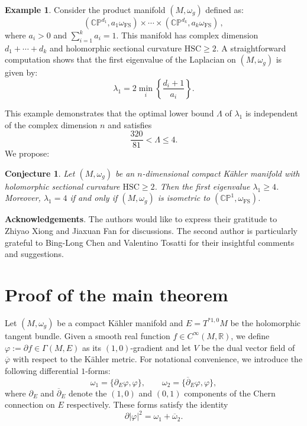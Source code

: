 \documentclass[12pt, reqno]{amsart}
\newcommand\bp{{\bar\partial}}
\theoremstyle{plain}
\newtheorem{conjecture}[thm]{Conjecture}
\theoremstyle{definition}
\newtheorem{example}[thm]{Example}
\newcommand{\eexample}{\end{example}}
\newcommand{\bexample}{\begin{example}}
\newcommand{\p}{\partial}
\renewcommand{\bar}{\overline}
\renewcommand{\phi}{\varphi}
\newcommand{\beq}{\begin{equation}}
\newcommand{\eeq}{\end{equation}}
\renewcommand{\bp}{\bar{\partial}}
\renewcommand{\>}{\rightarrow}
\newcommand{\C}{{\mathbb C}}
\renewcommand{\P}{{\mathbb P}}
\renewcommand{\#}{\sharp}
\numberwithin{equation}{section} %
\begin{document}
\bexample
Consider the product manifold $(M,\omega_g)$ defined as:
$$
(\mathbb{C}\mathbb{P}^{d_1},a_1\omega_{\mathrm{FS}})\times\cdots\times(\mathbb{C}\mathbb{P}^{d_k},a_k\omega_{\mathrm{FS}})\,,
$$
where $a_i> 0$ and $\sum\limits_{i=1}^k a_i=1$. This manifold has complex dimension $d_1+\cdots +d_k$ and
 holomorphic sectional curvature $\mathrm{HSC}\geq 2$. A straightforward computation shows that the first eigenvalue of the Laplacian on $(M,\omega_g)$ is given by:
\beq 
\lambda_1=2\min_i  \left\{\frac{d_i+1}{a_i}\right\}.\label{producteigenvalue}
\eeq 
\eexample
\noindent This example demonstrates that the optimal lower bound $\Lambda$ of $\lambda_1$ is
independent of the complex dimension $n$ and satisfies  \beq \frac{320}{81}< \Lambda\leq 4.\eeq  We propose:
\begin{conjecture} Let $ (M,\omega_g) $ be an $n$-dimensional compact K\"ahler manifold with holomorphic sectional
curvature $\mathrm{HSC}  \geq 2 $.  Then the first
eigenvalue $\lambda_1\geq 4$.
Moreover, $\lambda_1=4$ if and only if $(M,\omega_g)$ is isometric to $(\C\P^1, \omega_{\mathrm{FS}})$.
\end{conjecture}


\noindent\textbf{Acknowledgements}.  The authors would like to express their gratitude to Zhiyao Xiong and Jiaxuan Fan for discussions. The second author is particularly grateful to Bing-Long Chen and Valentino Tosatti for their insightful comments and suggestions. %


\baselineskip

\section{Proof of the main theorem}\label{2}

Let $ (M,\omega_g) $ be a compact K\"ahler manifold and $ E = T^{*1,0}M $ be  the  holomorphic tangent bundle.
 Given a smooth real function $ f \in C^{\infty}(M,\mathbb{R}) $,
 we define  $ \phi := \p f\in \Gamma(M,E) $ as its $(1,0)$-gradient and let $ V $ be  the dual vector field of $ \bar\phi $ with respect to the K\"ahler metric.
For notational convenience, we introduce the following differential $1$-forms:
\beq \omega_1 = \{ \p_E \phi, \phi \}, \qquad \omega_2 = \{ \bar\p_E \phi, \phi \}, \eeq
where $\p_E$ and $\bp_E$ denote the $(1,0)$ and $(0,1)$ components of the Chern connection on
$E$ respectively. These forms satisfy the  identity
\begin{equation}
\partial|\phi|^2 = \omega_1 + \overline{\omega}_2.
\end{equation}
\end{document}
